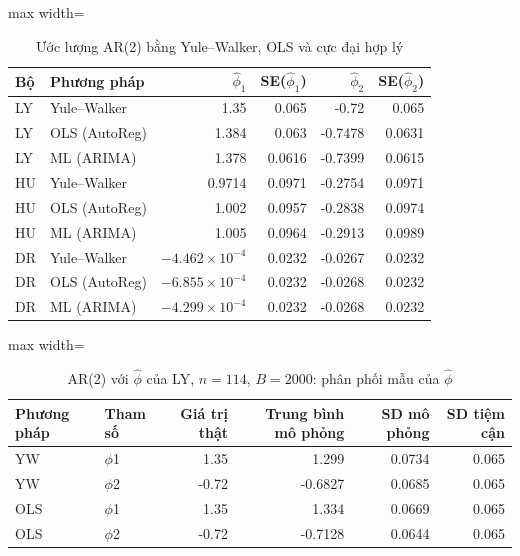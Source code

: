 \begin{table}[H]
\centering\footnotesize
\caption{Ước lượng AR(2) bằng Yule–Walker, OLS và cực đại hợp lý}\label{tab:tab_b11_12_estimators}
\begin{adjustbox}{max width=\linewidth}
\begin{tabular}{|l|l|r|r|r|r|}
\toprule
Bộ & Phương pháp & $\hat{\phi}_{1}$ & SE($\hat{\phi}_{1}$) & $\hat{\phi}_{2}$ & SE($\hat{\phi}_{2}$) \\
\midrule
LY & Yule–Walker & 1.35 & 0.065 & -0.72 & 0.065 \\
LY & OLS (AutoReg) & 1.384 & 0.063 & -0.7478 & 0.0631 \\
LY & ML (ARIMA) & 1.378 & 0.0616 & -0.7399 & 0.0615 \\
HU & Yule–Walker & 0.9714 & 0.0971 & -0.2754 & 0.0971 \\
HU & OLS (AutoReg) & 1.002 & 0.0957 & -0.2838 & 0.0974 \\
HU & ML (ARIMA) & 1.005 & 0.0964 & -0.2913 & 0.0989 \\
DR & Yule–Walker & $-4.462\times10^{-4}$ & 0.0232 & -0.0267 & 0.0232 \\
DR & OLS (AutoReg) & $-6.855\times10^{-4}$ & 0.0232 & -0.0268 & 0.0232 \\
DR & ML (ARIMA) & $-4.299\times10^{-4}$ & 0.0232 & -0.0268 & 0.0232 \\
\bottomrule
\end{tabular}
\end{adjustbox}\par{}
\end{table}
\begin{table}[H]
\centering\footnotesize
\caption{AR(2) với $\hat\phi$ của LY, $n=114$, $B=2000$: phân phối mẫu của $\hat\phi$}\label{tab:tab_b11_12_simulation}
\begin{adjustbox}{max width=\linewidth}
\begin{tabular}{|l|l|r|r|r|r|}
\toprule
Phương pháp & Tham số & Giá trị thật & Trung bình mô phỏng & SD mô phỏng & SD tiệm cận \\
\midrule
YW & $\phi$1 & 1.35 & 1.299 & 0.0734 & 0.065 \\
YW & $\phi$2 & -0.72 & -0.6827 & 0.0685 & 0.065 \\
OLS & $\phi$1 & 1.35 & 1.334 & 0.0669 & 0.065 \\
OLS & $\phi$2 & -0.72 & -0.7128 & 0.0644 & 0.065 \\
\bottomrule
\end{tabular}
\end{adjustbox}
\end{table}

